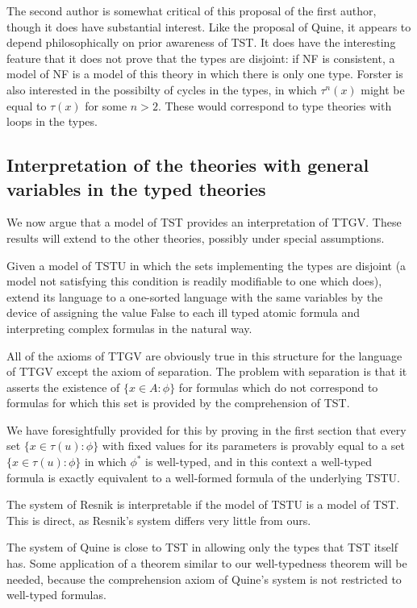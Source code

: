 \documentclass[12pt]{article}
\begin{document}
The second author is somewhat critical of this proposal of the first author, though it does have substantial interest.  Like the proposal of Quine, it appears to depend philosophically on prior awareness of TST.  It does have the interesting feature that it does not prove that the types are disjoint:  if NF is consistent, a model of NF is a model of this theory in which there is only one type.  Forster is also interested in the possibilty of cycles in the types, in which $\tau^n(x)$ might be equal to $\tau(x)$ for some $n>2$.  These would correspond to type theories with loops in the types.

\subsection{Interpretation of the theories with general variables in the typed theories}

We now argue that a model of TST provides an interpretation of TTGV.  These results will extend
to the other theories, possibly under special assumptions.

Given a model of TSTU in which the sets implementing the types are disjoint (a model not satisfying this condition is readily modifiable to one which does), extend its language to a one-sorted language with the same variables
by the device of assigning the value False to each ill typed atomic formula and interpreting complex formulas in the natural way.

All of the axioms of TTGV are obviously true in this structure for the language of TTGV except the axiom of separation.  The problem with separation is that it asserts the existence of $\{x \in A:\phi\}$ for formulas
which do not correspond to formulas for which this set is provided by the comprehension of TST.

We have foresightfully provided for this by proving in the first section that every set $\{x \in \tau(u):\phi\}$ with fixed values for its parameters is provably equal to a set $\{x \in \tau(u):\phi\}$ in which $\phi^*$ is well-typed, and in this context a well-typed formula is exactly equivalent to a well-formed formula of the underlying TSTU.

The system of Resnik is interpretable if the model of TSTU is a model of TST.  This is direct, as Resnik's system differs very little from ours.

The system of Quine is close to TST in allowing only the types that TST itself has.  Some application of a theorem similar to our well-typedness theorem will be needed, because the comprehension axiom of Quine's system is not restricted to well-typed formulas.
\end{document}
